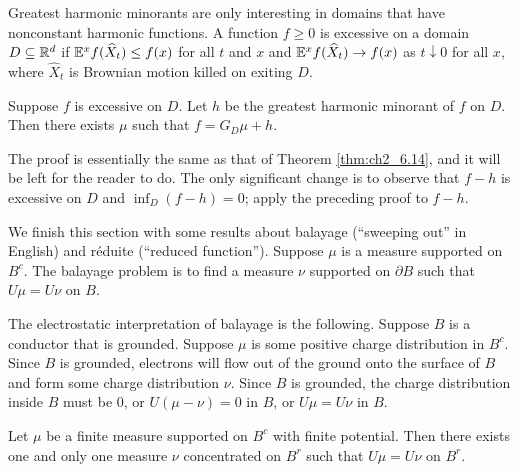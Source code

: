 Greatest harmonic minorants are only interesting in domains that have nonconstant harmonic functions. A function $f \geq 0$ is excessive on a domain $D \subseteq \mathbb{R}^d$ if $\mathbb{E}^xf(\widehat{X}_t) \leq f(x)$ for all $t$ and $x$ and $\mathbb{E}^xf(\widehat{X}_t) \to f(x)$ as $t \downarrow 0$ for all $x$, where $\widehat{X}_t$ is Brownian motion killed on exiting $D$.


\begin{theorem}\label{thm:ch2_6.15}
Suppose $f$ is excessive on $D$. Let $h$ be the greatest harmonic minorant of $f$ on $D$. Then there exists $\mu$ such that $f = G_D\mu + h$.
\end{theorem}

The proof is essentially the same as that of Theorem \ref{thm:ch2_6.14}, and it will be left for the reader to do. The only significant change is to observe that $f - h$ is excessive on $D$ and $\inf_D(f - h) = 0$; apply the preceding proof to $f - h$.



We finish this section with some results about balayage (``sweeping out'' in English) and r\'eduite (``reduced function''). Suppose $\mu$ is a measure supported on $B^c$. The balayage problem is to find a measure $\nu$ supported on $\partial B$ such that $U\mu = U\nu$ on $B$.

The electrostatic interpretation of balayage is the following. Suppose $B$ is a conductor that is grounded. Suppose $\mu$ is some positive charge distribution in $B^c$. Since $B$ is grounded, electrons will flow out of the ground onto the surface of $B$ and form some charge distribution $\nu$. Since $B$ is grounded, the charge distribution inside $B$ must be $0$, or $U(\mu - \nu) = 0$ in $B$, or $U\mu = U\nu$ in $B$.

\begin{proposition}\label{prop:ch2_6.16}
Let $\mu$ be a finite measure supported on $B^c$ with finite potential. Then there exists one and only one measure $\nu$ concentrated on $B^r$ such that $U\mu = U\nu$ on $B^r$.
\end{proposition}

